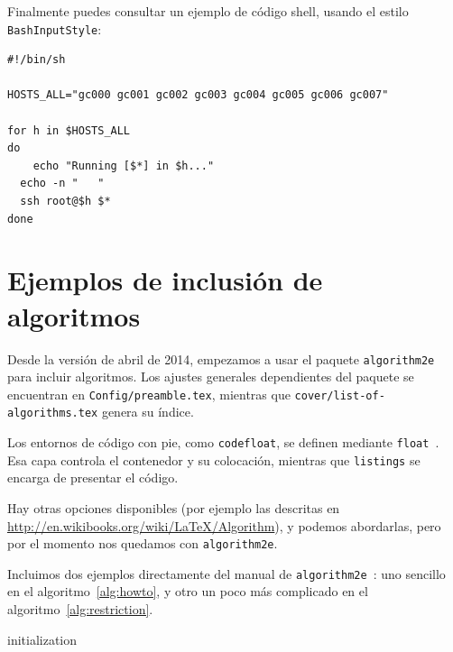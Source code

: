 \begin{codefloat}

\caption{Ejemplo con colores usando el estilo \texttt{Ccolor}}
\label{cod:sample5}
\end{codefloat}

Finalmente puedes consultar un ejemplo de código shell, usando el estilo
\texttt{BashInputStyle}:

\begin{lstlisting}[style=BashInputStyle, numbers=none]
#!/bin/sh

HOSTS_ALL="gc000 gc001 gc002 gc003 gc004 gc005 gc006 gc007"

for h in $HOSTS_ALL
do
	echo "Running [$*] in $h..."
  echo -n "   "
  ssh root@$h $*
done
\end{lstlisting}


\section{Ejemplos de inclusión de algoritmos}
\label{sec:algoritmos}

Desde la versión de abril de 2014, empezamos a usar el paquete \texttt{algorithm2e} para incluir algoritmos. Los ajustes generales dependientes del paquete se encuentran en \texttt{Config/preamble.tex}, mientras que \texttt{cover/list-of-algorithms.tex} genera su índice.

Los entornos de código con pie, como \texttt{codefloat}, se definen mediante \texttt{float}~\cite{float-manual}. Esa capa controla el contenedor y su colocación, mientras que \texttt{listings} se encarga de presentar el código.

Hay otras opciones disponibles (por ejemplo las descritas en
\url{http://en.wikibooks.org/wiki/LaTeX/Algorithm}), y podemos
abordarlas, pero por el momento nos quedamos con \texttt{algorithm2e}.

Incluimos dos ejemplos directamente del manual de \texttt{algorithm2e}~\cite{algorithm2e-manual}: uno sencillo en el
algoritmo~\ref{alg:howto}, y otro un poco más complicado en el
algoritmo~\ref{alg:restriction}.

\begin{algorithm}[H]
 \caption{How to write algorithms}
 \label{alg:howto}
 initialization\;
\end{algorithm}


